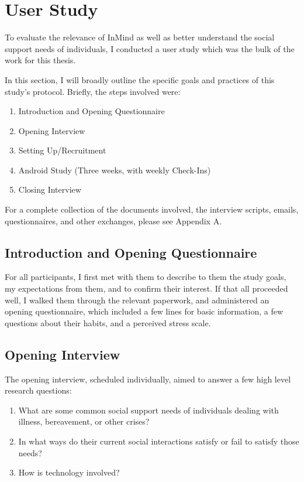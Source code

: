 \chapter{User Study}
To evaluate the relevance of InMind as well as better understand
the social support needs of individuals,
I conducted a user study which was the bulk of the work for this thesis.

In this section, I will broadly outline the specific goals
and practices of this study's protocol.
Briefly, the steps involved were:
\begin{enumerate}
\item Introduction and Opening Questionnaire
\item Opening Interview
\item Setting Up/Recruitment
\item Android Study (Three weeks, with weekly Check-Ins)
\item Closing Interview
\end{enumerate}

  For a complete collection of the documents involved,
  the interview scripts, emails, questionnaires, and other exchanges,
  please see Appendix A.

\section{Introduction and Opening Questionnaire}
  For all participants,
  I first met with them to describe to them the study goals,
  my expectations from them, and to confirm their interest.
  If that all proceeded well, I walked them through the relevant paperwork,
  and administered an opening questionnaire,
  which included a few lines for basic information,
  a few questions about their habits,
  and a perceived stress scale.
  
\section{Opening Interview}
  \label{sec:opening_int}
  The opening interview, scheduled individually,
  aimed to answer a few high level research questions:
  \begin{enumerate}
  \item What are some common social support needs of individuals
  dealing with illness, bereavement, or other crises?
  \item In what ways do their current social interactions satisfy
  or fail to satisfy those needs?
  \item How is technology involved?
  \end{enumerate}

